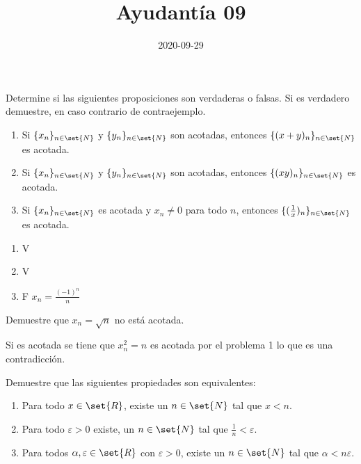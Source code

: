 \documentclass{ayudantia}
\title{Ayudantía 09}
\date{2020-09-29}
\begin{document}
\maketitle

\begin{prob}
    Determine si las siguientes proposiciones son verdaderas o falsas. Si es verdadero demuestre, en caso contrario de contraejemplo.
    \begin{enumerate}[label=(\alph*)]
        \item Si \(\{x_n\}_{n\in\set{N}}\) y \(\{y_n\}_{n\in\set{N}}\) son acotadas, entonces \(\{(x+y)_n\}_{n\in\set{N}}\) es acotada.
        \item Si \(\{x_n\}_{n\in\set{N}}\) y \(\{y_n\}_{n\in\set{N}}\) son acotadas, entonces \(\{(xy)_n\}_{n\in\set{N}}\) es acotada.
        \item Si \(\{x_n\}_{n\in\set{N}}\) es acotada y \(x_n\neq0\) para todo \(n\), entonces \(\{(\frac1x)_n\}_{n\in\set{N}}\) es acotada.
    \end{enumerate}
\end{prob}

\begin{ans}
    \begin{sol}
        \begin{enumerate}[label=(\alph*)]
            \item V
            \item V
            \item F \(x_n=\frac{(-1)^n}n\)
        \end{enumerate}
    \end{sol}
\end{ans}


\begin{prob}
    Demuestre que \(x_n=\sqrt{n}\) no está acotada.
\end{prob}

\begin{ans}
    \begin{sol}
        Si es acotada se tiene que \(x^2_n=n\) es acotada por el problema 1 lo que es una contradicción.
    \end{sol}
\end{ans}


\begin{prob}
    Demuestre que las siguientes propiedades son equivalentes:
    \begin{enumerate}[label=(\alph*)]
        \item Para todo \(x\in\set{R}\), existe un \(n\in\set{N}\) tal que \(x<n\).
        \item Para todo \(\varepsilon>0\) existe, un \(n\in\set{N}\) tal que \(\frac1n<\varepsilon\).
        \item Para todos \(\alpha,\varepsilon\in\set{R}\) con \(\varepsilon>0\), existe un \(n\in\set{N}\) tal que \(\alpha<n\varepsilon\).
    \end{enumerate}
\end{prob}
\end{document}
